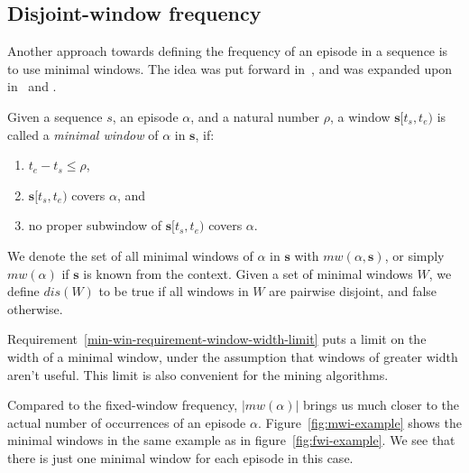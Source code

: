\subsection{Disjoint-window frequency}

Another approach towards defining the frequency of an episode in a sequence is to use minimal windows. The idea was put forward in~\citep{mannila1997discovery}, and was expanded upon in~\cite{laxman2005discovering} and \citep{laxman2007fast}.

\begin{definition} \label{def:minimal-window}
Given a sequence $ s $, an episode $ \alpha $, and a natural number $ \rho $, a window $ \boldsymbol{s}[t_s, t_e) $ is called a \emph{minimal window} of $ \alpha $ in $ \boldsymbol{s} $, if:
\begin{enumerate}
\item $ t_e - t_s \leq \rho $, \label{min-win-requirement-window-width-limit}
\item $ \boldsymbol{s}[t_s, t_e) $ covers $ \alpha $, and
\item no proper subwindow of $ \boldsymbol{s}[t_s, t_e) $ covers $ \alpha $.
\end{enumerate}

We denote the set of all minimal windows of $ \alpha $ in $ \boldsymbol{s} $ with $ mw(\alpha, \boldsymbol{s}) $, or simply $ mw(\alpha) $ if $ \boldsymbol{s} $ is known from the context. Given a set of minimal windows $ W $, we define $ dis(W) $ to be true if all windows in $ W $ are pairwise disjoint, and false otherwise.
\end{definition}

Requirement~\ref{min-win-requirement-window-width-limit} puts a limit on the width of a minimal window, under the assumption that windows of greater width aren't useful. This limit is also convenient for the mining algorithms.

Compared to the fixed-window frequency, $ | mw(\alpha) | $ brings us much closer to the actual number of occurrences of an episode $ \alpha $. Figure~\ref{fig:mwi-example} shows the minimal windows in the same example as in figure~\ref{fig:fwi-example}. We see that there is just one minimal window for each episode in this case.


